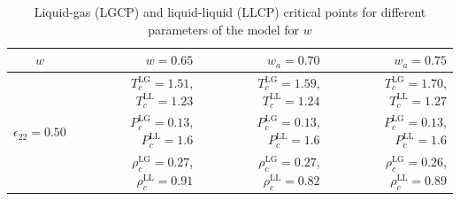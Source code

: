\documentclass[9pt,twocolumn,twoside,lineno]{pnas-new}
\begin{document}
\begin{table}[h!]
\caption{Liquid-gas (LGCP) and liquid-liquid (LLCP) critical points for different parameters of the model for $w$}
\centering
\begin{tabular}{ |c||r|r|r|} 
 \hline
    $w$ %
    
    & $w = 0.65$ & $w_a = 0.70$ & $w_a = 0.75$  \\ 
  \hline
  \hline
 \multirow{3}{4em}{$\epsilon_{22}=0.50$}
 &   $T_c^\text{LG}=1.51$,  $T_c^\text{LL}=1.23$
 &   $T_c^\text{LG}=1.59$,  $T_c^\text{LL}=1.24$
 &   $T_c^\text{LG}=1.70$,  $T_c^\text{LL}=1.27$ \\
 & $P_c^\text{LG}=0.13$, $P_c^\text{LL}=1.6$ 
 & $P_c^\text{LG}=0.13$, $P_c^\text{LL}=1.6$
 & $P_c^\text{LG}=0.13$, $P_c^\text{LL}=1.6$ \\
 & $\rho_c^\text{LG}=0.27$, $\rho_c^\text{LL}=0.91$ &  $\rho_c^\text{LG}=0.27$, $\rho_c^\text{LL}=0.82$ &  
 $\rho_c^\text{LG}=0.26$, $\rho_c^\text{LL}=0.89$\\ 
 \hline
\end{tabular}
\label{Table4a}
\end{table}
\end{document}
